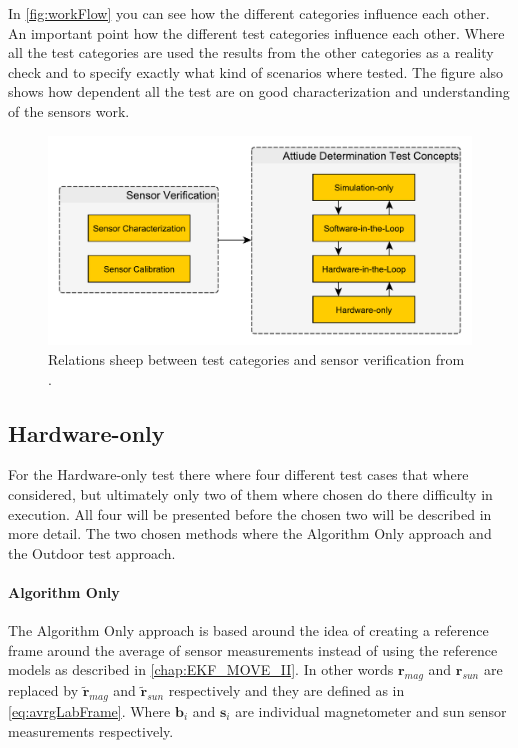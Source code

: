 In \autoref{fig:workFlow} you can see how the different categories influence each other. An important point how the different test categories influence each other. Where all the test categories are used the results from the other categories as a reality check and to specify exactly what kind of scenarios where tested. The figure also shows how dependent all the test are on good characterization and understanding of the sensors work. 

\begin{figure}[tbp]
	\centering
	\includegraphics[width=0.7\columnwidth]{./Pictures/testing_concept}
	\caption{Relations sheep between test categories and sensor verification from \cite{DavidThesis}.}
	\label{fig:workFlow}
\end{figure}            

\subsection{Hardware-only}\label{chap:HardwareOnly}
For the Hardware-only test there where four different test cases that where considered, but ultimately only two of them where chosen do there difficulty in execution. All four will be presented before the chosen two will be described in more detail. The two chosen methods where the Algorithm Only approach and the Outdoor test approach.   

\paragraph{Algorithm Only}
The Algorithm Only approach is based around the idea of creating a reference frame around the average of sensor measurements instead of using the reference models as described in \autoref{chap:EKF_MOVE_II}. In other words $\boldsymbol{r}_{mag}$ and $\boldsymbol{r}_{sun}$ are replaced by $\tilde{\boldsymbol{r}}_{mag}$ and $\tilde{\boldsymbol{r}}_{sun}$ respectively and they are defined as in \autoref{eq:avrgLabFrame}. Where $\boldsymbol{b}_i$ and $\boldsymbol{s}_i$ are individual magnetometer and sun sensor measurements respectively.  

